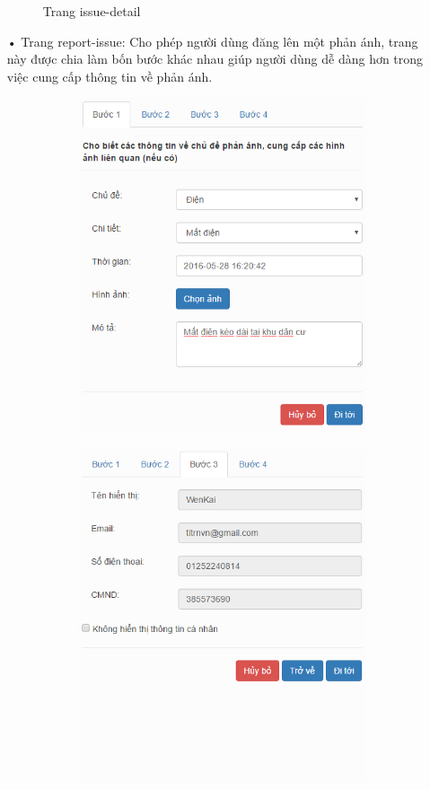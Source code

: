 \documentclass[a4paper]{article}
\begin{document}
\begin{itemize}
\begin{center}
\begin{figure}[htp]
\begin{center}
    	\end{center}
    	\caption{Trang issue-detail}
    	\label{refhinh1}
    	\end{figure}
    \end{center}
	\item[•]Trang report-issue: Cho phép người dùng đăng lên một phản ánh, trang này được chia làm bốn bước khác nhau giúp người dùng dễ dàng hơn trong việc cung cấp thông tin về phản ánh.
	\begin{figure}[h]
		\centering
		\begin{subfigure}{.5\textwidth}
  			\centering
  			\includegraphics[width=0.7\linewidth]{Step1.PNG}
 		    \caption{}
		\end{subfigure}%
		\begin{subfigure}{.5\textwidth}
  			\centering
  			\includegraphics[width=0.7\linewidth]{Step3.PNG}

\end{subfigure}
\end{figure}
\end{itemize}
\end{document}
